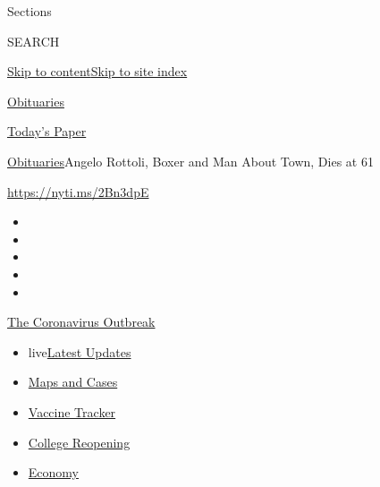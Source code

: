 Sections

SEARCH

\protect\hyperlink{site-content}{Skip to
content}\protect\hyperlink{site-index}{Skip to site index}

\href{https://www.nytimes3xbfgragh.onion/section/obituaries}{Obituaries}

\href{https://myaccount.nytimes3xbfgragh.onion/auth/login?response_type=cookie\&client_id=vi}{}

\href{https://www.nytimes3xbfgragh.onion/section/todayspaper}{Today's
Paper}

\href{/section/obituaries}{Obituaries}\textbar{}Angelo Rottoli, Boxer
and Man About Town, Dies at 61

\url{https://nyti.ms/2Bn3dpE}

\begin{itemize}
\item
\item
\item
\item
\item
\end{itemize}

\href{https://www.nytimes3xbfgragh.onion/news-event/coronavirus?action=click\&pgtype=Article\&state=default\&region=TOP_BANNER\&context=storylines_menu}{The
Coronavirus Outbreak}

\begin{itemize}
\tightlist
\item
  live\href{https://www.nytimes3xbfgragh.onion/2020/08/04/world/coronavirus-covid-19.html?action=click\&pgtype=Article\&state=default\&region=TOP_BANNER\&context=storylines_menu}{Latest
  Updates}
\item
  \href{https://www.nytimes3xbfgragh.onion/interactive/2020/us/coronavirus-us-cases.html?action=click\&pgtype=Article\&state=default\&region=TOP_BANNER\&context=storylines_menu}{Maps
  and Cases}
\item
  \href{https://www.nytimes3xbfgragh.onion/interactive/2020/science/coronavirus-vaccine-tracker.html?action=click\&pgtype=Article\&state=default\&region=TOP_BANNER\&context=storylines_menu}{Vaccine
  Tracker}
\item
  \href{https://www.nytimes3xbfgragh.onion/2020/08/02/us/covid-college-reopening.html?action=click\&pgtype=Article\&state=default\&region=TOP_BANNER\&context=storylines_menu}{College
  Reopening}
\item
  \href{https://www.nytimes3xbfgragh.onion/live/2020/08/03/business/stock-market-today-coronavirus?action=click\&pgtype=Article\&state=default\&region=TOP_BANNER\&context=storylines_menu}{Economy}
\end{itemize}

